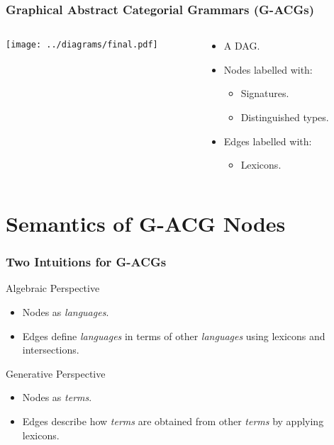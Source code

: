 \documentclass{beamer}
\begin{document}
\begin{frame}
  \frametitle{Graphical Abstract Categorial Grammars (G-ACGs)}

  \begin{columns}[c]
    \begin{column}{0.6\textwidth}
      \begin{center}
        \texttt{[image: ../diagrams/final.pdf]}
      \end{center}
    \end{column}

    \pause

    \begin{column}{0.4\textwidth}
        \begin{itemize}
        \item A DAG.
        \item Nodes labelled with:
          \begin{itemize}
          \item Signatures.
          \item Distinguished types.
          \end{itemize}
        \item Edges labelled with:
          \begin{itemize}
          \item Lexicons.
          \end{itemize}
        \end{itemize}
    \end{column}
  \end{columns}
\end{frame}




\section{Semantics of G-ACG Nodes}

\begin{frame}
  \frametitle{Two Intuitions for G-ACGs}

  \begin{block}{Algebraic Perspective}
    \begin{itemize}
    \item Nodes as \emph{languages}.
    \item Edges define \emph{languages} in terms of other
      \emph{languages} using lexicons and intersections.
    \end{itemize}
  \end{block}
  \begin{block}{Generative Perspective}
    \begin{itemize}
    \item Nodes as \emph{terms}.
    \item Edges describe how \emph{terms} are obtained from other
      \emph{terms} by applying lexicons.
    \end{itemize}
  \end{block}
\end{frame}
\end{document}
